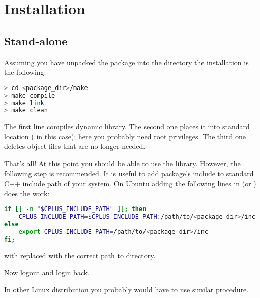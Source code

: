 \section{Installation}
\label{sec:inst}
\subsection{Stand-alone}
Assuming you have unpacked the package into the directory  the installation is the following:

\begin{lstlisting}[language=bash]
> cd <package_dir>/make
> make compile
> make link
> make clean
\end{lstlisting}

The first  line compiles dynamic library. The second one places it into
standard location ( in this case); here you probably need root privileges.
The third one deletes object files that are no longer needed.

That's all! At this point you should be able to use the library. However, the following 
step is recommended. It is useful to add package's include to standard C++ include path of 
your system. On Ubuntu adding the following lines in  (or ) does the work:

\begin{lstlisting}[language=bash]
if [[ -n "$CPLUS_INCLUDE_PATH" ]]; then
    CPLUS_INCLUDE_PATH=$CPLUS_INCLUDE_PATH:/path/to/<package_dir>/inc
else
    export CPLUS_INCLUDE_PATH=/path/to/<package_dir>/inc
fi;
\end{lstlisting}
with  replaced with the correct path to  directory.

Now logout and login back.

In other Linux distribution you probably would have to use similar procedure. 

